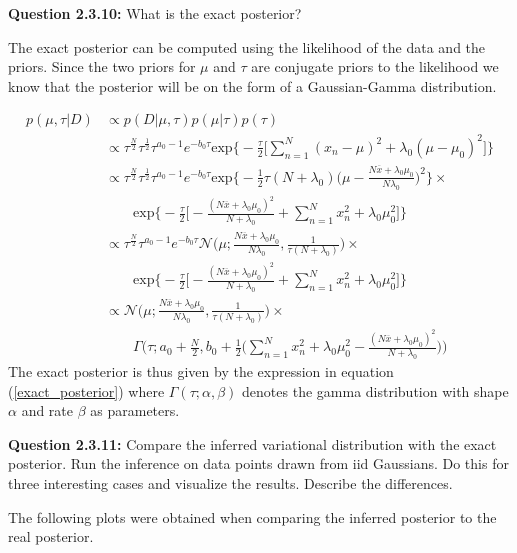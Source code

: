 \begin{tcolorbox}
\textbf{Question 2.3.10:}
What is the exact posterior?
\end{tcolorbox}
The exact posterior can be computed using the likelihood of the data and the priors. Since the two priors for $\mu$ and $\tau$ are conjugate priors to the likelihood we know that the posterior will be on the form of a Gaussian-Gamma distribution.

\begin{align}
  p(\mu,\tau|D) & \propto  p(D|\mu, \tau)p(\mu|\tau) p(\tau) \nonumber \\
  & \propto \tau^{\frac{N}{2}}\tau^{\frac{1}{2}}\tau^{a_0 - 1} e^{-b_0\tau} \text{exp} \Bigg\{ -\frac{\tau}{2}\Bigg[ \sum_{n=1}^N (x_n - \mu)^2 + \lambda_0 (\mu - \mu_0)^2 \Bigg] \Bigg \} \nonumber \\
  & \propto \tau^{\frac{N}{2}}\tau^{\frac{1}{2}}\tau^{a_0 - 1} e^{-b_0\tau} \text{exp}
   \Bigg\{ -\frac{1}{2}\tau (N + \lambda_0) \bigg( \mu -  \frac{N \overline{x} + \lambda_0 \mu_0}{N \lambda_0} \bigg)^2 \Bigg \} \times \nonumber \\
  & \qquad \text{exp} \Bigg\{ -\frac{\tau}{2}\Bigg[- \frac{(N\overline{x} + \lambda_0\mu_0)^2}{N+\lambda_0} + \sum_{n=1}^N x_n^2 + \lambda_0\mu_0^2 \Bigg] \Bigg \} \nonumber \\
  & \propto \tau^{\frac{N}{2}}\tau^{a_0 - 1} e^{-b_0\tau} \mathcal{N} \bigg( \mu; \frac{N \overline{x} + \lambda_0 \mu_0}{N \lambda_0}, \frac{1}{\tau (N + \lambda_0)} \bigg) \times \nonumber \\
  & \qquad \text{exp} \Bigg\{ -\frac{\tau}{2}\Bigg[- \frac{(N\overline{x} + \lambda_0\mu_0)^2}{N+\lambda_0} + \sum_{n=1}^N x_n^2 + \lambda_0\mu_0^2 \Bigg] \Bigg\} \nonumber \\
  & \propto \mathcal{N} \bigg( \mu; \frac{N \overline{x} + \lambda_0 \mu_0}{N \lambda_0}, \frac{1}{\tau (N + \lambda_0)} \bigg) \times \nonumber \\
  & \qquad \Gamma \bigg(\tau; a_0 + \frac{N}{2},
  b_0 + \frac{1}{2}\big (\sum_{n=1}^N x_n^2 + \lambda_0 \mu_0^2 - \frac{(N\overline{x} + \lambda_0\mu_0)^2}{N+\lambda_0}\big ) \bigg)
  \label{exact_posterior}
\end{align}
The exact posterior is thus given by the expression in equation (\ref{exact_posterior}) where $\Gamma(\tau; \alpha, \beta)$ denotes the gamma distribution with shape $\alpha$ and rate $\beta$ as parameters.
\\

\begin{tcolorbox}
\textbf{Question 2.3.11:}
Compare the inferred variational distribution with the exact posterior. Run the inference on data points drawn from iid Gaussians. Do this for three interesting cases and visualize the results. Describe the differences.
\end{tcolorbox}
The following plots were obtained when comparing the inferred posterior to the real posterior.



